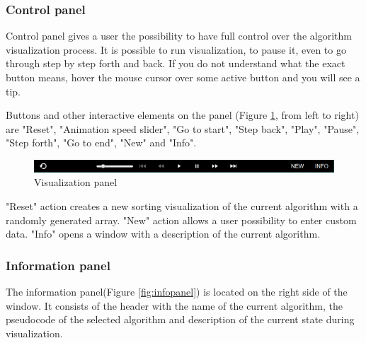 \documentclass[
  field=inf,
  biblatex,
  language=english,
  glossaries,
  theorems=false,
  index
]{kidiplom}
\begin{document}
\subsubsection{Control panel}

Control panel gives a user the possibility to have full control over the algorithm visualization process. It is possible to run visualization, to pause it, even to go through step by step forth and back. If you do not understand what the exact button means, hover the mouse cursor over some active button and you will see a tip.

Buttons and other interactive elements on the panel (Figure \ref{fig:controls}, from left to right) are "Reset", "Animation speed slider", "Go to start", "Step back", "Play", "Pause", "Step forth", "Go to end", "New" and "Info".

\begin{figure}[H]
\begin{center}
	\includegraphics[scale=0.5]{img/ui/Controls.png}
	\caption{Visualization panel}\label{fig:controls}
\end{center}
\end{figure}

"Reset" action creates a new sorting visualization of the current algorithm with a randomly generated array. "New" action allows a user possibility to enter custom data. "Info" opens a window with a description of the current algorithm.

\subsubsection{Information panel}

The information panel(Figure \ref{fig:infopanel}) is located on the right side of the window. It consists of the header with the name of the current algorithm, the pseudocode of the selected algorithm and description of the current state during visualization.
\end{document}
